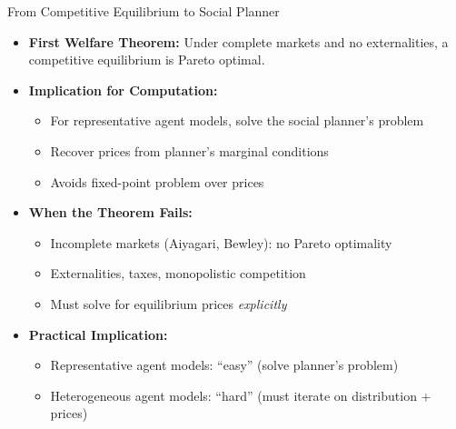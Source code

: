 \begin{frame}{From Competitive Equilibrium to Social Planner}
\begin{itemize}
\item \textbf{First Welfare Theorem:} Under complete markets and no externalities, a competitive equilibrium is Pareto optimal.

\medskip
\item \textbf{Implication for Computation:}
\begin{itemize}
    \item For representative agent models, solve the social planner's problem
    \item Recover prices from planner's marginal conditions
    \item Avoids fixed-point problem over prices
\end{itemize}

\medskip
\item \textbf{When the Theorem Fails:}
\begin{itemize}
    \item Incomplete markets (Aiyagari, Bewley): no Pareto optimality
    \item Externalities, taxes, monopolistic competition
    \item Must solve for equilibrium prices \emph{explicitly}
\end{itemize}

\medskip
\item \textbf{Practical Implication:}
\begin{itemize}
    \item Representative agent models: ``easy'' (solve planner's problem)
    \item Heterogeneous agent models: ``hard'' (must iterate on distribution + prices)
\end{itemize}
\end{itemize}
\end{frame}

